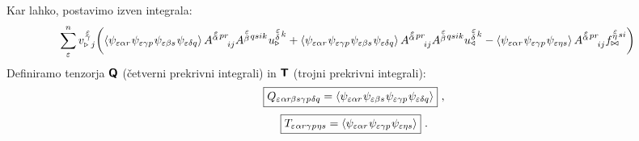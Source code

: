 Kar lahko, postavimo izven integrala:
\begin{equation*}
   \mkern-20mu \sum^n_\varepsilon
   v^{\mkern 2mu \substack{\varepsilon \\[-0.65mm] \gamma \\[-0.2mm]}}_{\triangleright \mkern5mu j}
   \qty( \expval{
      \psi_{ \varepsilon \alpha r} \mkern1mu
      \psi_{\varepsilon \gamma p} \mkern1mu
      \psi_{\varepsilon \beta s} \mkern1mu
      \psi_{\varepsilon \delta q} }
   A^{\substack{\mkern2mu \varepsilon \\[-0.65mm] \alpha} \mkern2mu p r}_{\mkern29mu i j}
   A^{\substack{\mkern2mu \varepsilon \\[0.05mm] \beta} \mkern2mu q s i k} \mkern1mu
   u^{\substack{\mkern2mu \varepsilon \\[0.09mm] \delta} \mkern2mu k}_\triangleright
   +
   \expval{
      \psi_{ \varepsilon \alpha r} \mkern1mu
      \psi_{\varepsilon \gamma p} \mkern1mu
      \psi_{\varepsilon \beta s} \mkern1mu
      \psi_{\varepsilon \delta q} }
   A^{\substack{\mkern2mu \varepsilon \\[-0.65mm] \alpha} \mkern2mu p r}_{\mkern29mu i j}
   A^{\substack{\mkern2mu \varepsilon \\[0.05mm] \beta} \mkern2mu q s i k}
   u^{\substack{\mkern2mu \varepsilon \\[0.09mm] \delta} \mkern2mu k}_\triangleleft
   -
   \expval{
      \psi_{ \varepsilon \alpha r} \mkern1mu
      \psi_{\varepsilon \gamma p} \mkern1mu
      \psi_{\varepsilon \eta s} }
   A^{\substack{\mkern2mu \varepsilon \\[-0.65mm] \alpha} \mkern2mu p r}_{\mkern29mu i j}
   f^{\substack{\mkern2mu \varepsilon \\[-0.59mm] \eta} \mkern2mu s i}_{\bowtie} )
\end{equation*}
Definiramo tenzorja $\bm{\mathsf{Q}}$ (četverni prekrivni integrali) in $\bm{\mathsf{T}}$ (trojni prekrivni integrali):
\begin{equation}
   \boxed{
   Q_{\varepsilon \mkern1mu  \alpha r  \mkern-1mu \beta s   \gamma \mkern1mu p \mkern1mu  \delta q}
   =
   \expval{
      \psi_{ \varepsilon   \alpha r} \mkern1mu
      \psi_{ \varepsilon   \beta s} \mkern1mu
      \psi_{ \varepsilon   \gamma p} \mkern1mu
      \psi_{ \varepsilon   \delta q} } } \ ,
\end{equation}
\begin{equation}
   \boxed{
   T_{\varepsilon \mkern1mu  \alpha r   \gamma \mkern1mu p  \mkern1mu \eta s}
   =
   \expval{
      \psi_{\varepsilon \alpha r} \mkern1mu
      \psi_{\varepsilon \gamma p} \mkern1mu
      \psi_{ \varepsilon \eta s} } } \ .
\end{equation}
